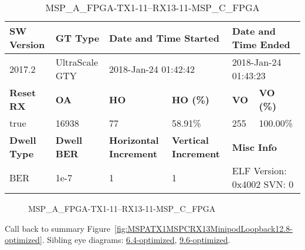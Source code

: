 \begin{table}[h]
\centering
\caption{MSP\_A\_FPGA-TX1-11--RX13-11-MSP\_C\_FPGA}
\label{tab:MSPAFPGATX111RX1311MSPCFPGA12.8-optimized}
\begin{tabular}{@{}|l|l|l|l|l|l|@{}}
\toprule
\textbf{SW Version}                & \textbf{GT Type}   & \multicolumn{2}{l|}{\textbf{Date and Time Started}}            & \multicolumn{2}{l|}{\textbf{Date and Time Ended}}        \\ \midrule
2017.2                       & UltraScale GTY          & \multicolumn{2}{l|}{2018-Jan-24 01:42:42}                   & \multicolumn{2}{l|}{2018-Jan-24 01:43:23}               \\ \midrule
\textbf{Reset RX}                  & \textbf{OA} & \textbf{HO}   & \textbf{HO (\%)} & \textbf{VO} & \textbf{VO (\%)} \\ \midrule
true & 16938        & 77          & 58.91\%        & 255        & 100.00\%       \\ \midrule
\textbf{Dwell Type}                & \textbf{Dwell BER} & \textbf{Horizontal Increment} & \textbf{Vertical Increment}    & \multicolumn{2}{l|}{\textbf{Misc Info}}                  \\ \midrule
BER                            & 1e-7        & 1        & 1           & \multicolumn{2}{l|}{ELF Version: 0x4002 SVN: 0}                         \\ \bottomrule
\end{tabular}
\end{table}

\begin{figure}[h]
\caption{MSP\_A\_FPGA-TX1-11--RX13-11-MSP\_C\_FPGA} \label{fig:MSPAFPGATX111RX1311MSPCFPGA12.8-optimized}
\end{figure}

Call back to summary Figure~\ref{fig:MSPATX1MSPCRX13MinipodLoopback12.8-optimized}.
Sibling eye diagrams: \hyperref[sec:MSPAFPGATX111RX1311MSPCFPGA6.4-optimized]{6.4-optimized}, \hyperref[sec:MSPAFPGATX111RX1311MSPCFPGA9.6-optimized]{9.6-optimized}.

\clearpage
\newpage

